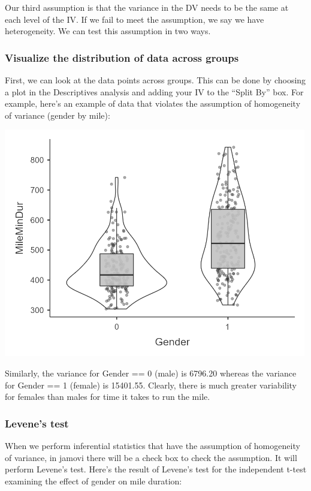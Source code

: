 \documentclass[
]{book}
\begin{document}
Our third assumption is that the variance in the DV needs to be the same at each level of the IV. If we fail to meet the assumption, we say we have heterogeneity. We can test this assumption in two ways.

\hypertarget{visualize-the-distribution-of-data-across-groups}{%
\subsubsection{Visualize the distribution of data across groups}\label{visualize-the-distribution-of-data-across-groups}}

First, we can look at the data points across groups. This can be done by choosing a plot in the Descriptives analysis and adding your IV to the ``Split By'' box. For example, here's an example of data that violates the assumption of homogeneity of variance (gender by mile):

\includegraphics[width=5.20833in,height=\textheight]{images/06-inferential/homogeneity.png}

Similarly, the variance for Gender == 0 (male) is 6796.20 whereas the variance for Gender == 1 (female) is 15401.55. Clearly, there is much greater variability for females than males for time it takes to run the mile.

\hypertarget{levenes-test}{%
\subsubsection{Levene's test}\label{levenes-test}}

When we perform inferential statistics that have the assumption of homogeneity of variance, in jamovi there will be a check box to check the assumption. It will perform Levene's test. Here's the result of Levene's test for the independent t-test examining the effect of gender on mile duration:
\end{document}
